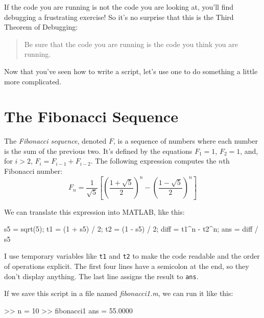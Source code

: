 

If the code you are running is not the code you are looking
at, you'll find debugging a frustrating exercise!  So it's no surprise that this is the Third Theorem of Debugging:

\begin{quote}
Be sure that the code you are running
is the code you think you are running.
\end{quote}

Now that you've seen how to write a script, let's use one to do something a little more complicated.

\section{The Fibonacci Sequence}


The \emph{Fibonacci sequence}, denoted $F$, is a sequence of numbers where each number is the sum of the previous two.
It's defined by the equations $F_1 = 1$, $F_2 = 1$, and, for $i > 2$, $F_{i} = F_{i-1} + F_{i-2}$.
The following expression computes the $n$th Fibonacci number:
%
\begin{equation*}
F_n = \frac{1}{\sqrt{5}}
\left[
\left( \frac{1 + \sqrt{5}}{2} \right)^{n} -
\left( \frac{1 - \sqrt{5}}{2} \right)^{n}
\right]
\end{equation*}
%

We can translate this expression into MATLAB, like this:

\begin{code}
s5 = sqrt(5);
t1 = (1 + s5) / 2;
t2 = (1 - s5) / 2;
diff = t1^n - t2^n;
ans = diff / s5
\end{code}

I use temporary variables like \lstinline{t1} and \lstinline{t2} to make the code readable and the order of operations explicit.  The first four lines have a semicolon at the end, so they don't display anything.  The last line assigns the result to \lstinline{ans}.


If we save this script in a file named \emph{fibonacci1.m}, we can run it like this:

\begin{code}
>> n = 10
>> fibonacci1
ans = 55.0000
\end{code}

